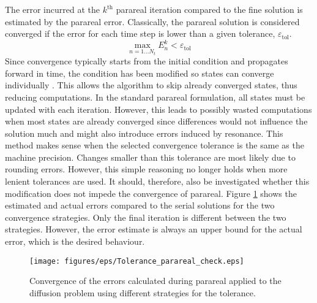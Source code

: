 The error incurred at the $k^\mathrm{th}$  parareal iteration compared to the fine solution is estimated by the parareal error. Classically, the parareal solution is considered converged if the error for each time step is lower than a given tolerance, $\varepsilon_\mathrm{tol}$. \[
    \max_{n =1...N_t}E^k_n < \varepsilon_\mathrm{tol}
\] 
Since convergence typically starts from the initial condition and propagates forward in time, the condition has been modified so states can converge individually \cite{d_samaddar_parallelization_2010}. This allows the algorithm to skip already converged states, thus reducing computations. In the standard parareal formulation, all states must be updated with each iteration. However, this leads to possibly wasted computations when most states are already converged since differences would not influence the solution much and might also introduce errors induced by resonance. This method makes sense when the selected convergence tolerance is the same as the machine precision. Changes smaller than this tolerance are most likely due to rounding errors. However, this simple reasoning no longer holds when more lenient tolerances are used. It should, therefore, also be investigated whether this modification does not impede the convergence of parareal. Figure \ref{fig: CN-parareal-convergence-tolerance} shows the estimated and actual errors compared to the serial solutions for the two convergence strategies. Only the final iteration is different between the two strategies. However, the error estimate is always an upper bound for the actual error, which is the desired behaviour.
\begin{figure}[h]
    \centering
    \texttt{[image: figures/eps/Tolerance\_parareal\_check.eps]}
    \caption{Convergence of the errors calculated during parareal applied to the diffusion problem using different strategies for the tolerance.}
    \label{fig: CN-parareal-convergence-tolerance}
\end{figure}

